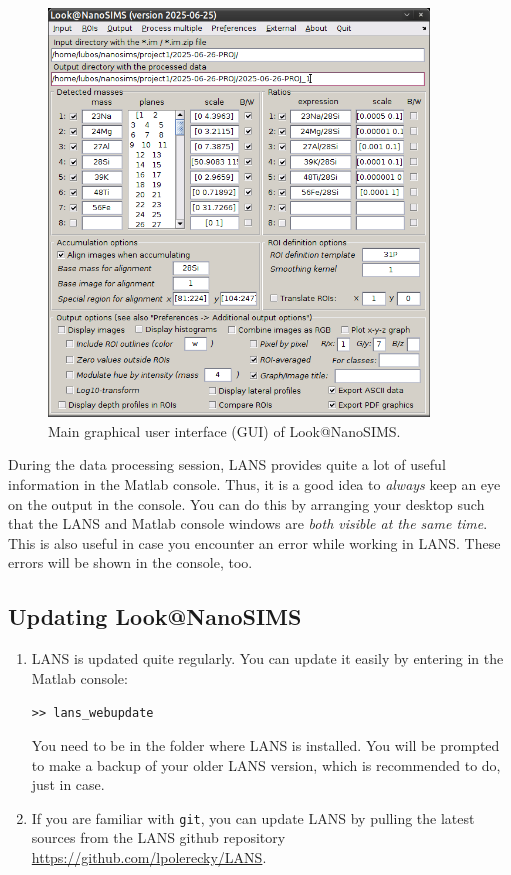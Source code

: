 \documentclass[a4paper, 11pt]{article}
\newcommand{\ttt}[1]{\texttt{#1}}
\newcommand\mnote{\marginnote{\fbox{\textbf{\bf Note}}}}
\begin{document}
\begin{figure}[!t]
\centering
\includegraphics[width=0.9\textwidth]{figs1/LANS-maingui}
\caption{\label{fig1:mainLANSgui}%
Main graphical user interface (GUI) of Look@NanoSIMS.}
\end{figure}

\mnote
During the data processing session, LANS provides quite a lot of useful information in the Matlab console. Thus, it is a good idea to \emph{always} keep an eye on the output in the console. You can do this by arranging your desktop such that the LANS and Matlab console windows are \emph{both visible at the same time}. This is also useful in case you encounter an error while working in LANS. These errors will be shown in the console, too.



\subsection{Updating Look@NanoSIMS}

\begin{enumerate}
 
\item LANS is updated quite regularly. You can update it easily by entering in the Matlab console:

\ttt{>> lans\_webupdate} 

You need to be in the folder where LANS is installed. You will be prompted to make a backup of your older LANS version, which is recommended to do, just in case.

\item If you are familiar with \ttt{git}, you can update LANS by pulling the latest sources from the LANS github repository \url{https://github.com/lpolerecky/LANS}.

\end{enumerate}
\end{document}
